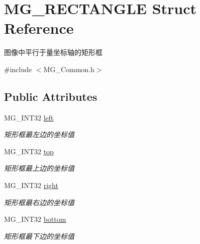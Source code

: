 \hypertarget{struct_m_g___r_e_c_t_a_n_g_l_e}{}\section{M\+G\+\_\+\+R\+E\+C\+T\+A\+N\+G\+LE Struct Reference}
\label{struct_m_g___r_e_c_t_a_n_g_l_e}


图像中平行于量坐标轴的矩形框  




{\ttfamily \#include $<$M\+G\+\_\+\+Common.\+h$>$}

\subsection*{Public Attributes}
\begin{DoxyCompactItemize}
\item 
\mbox{\label{struct_m_g___r_e_c_t_a_n_g_l_e_a0f4b5d317c394e8a54d395a0780d83df}} 
M\+G\+\_\+\+I\+N\+T32 \hyperlink{struct_m_g___r_e_c_t_a_n_g_l_e_a0f4b5d317c394e8a54d395a0780d83df}{left}
\begin{DoxyCompactList}\small\item\em 矩形框最左边的坐标值 \end{DoxyCompactList}\item 
\mbox{\label{struct_m_g___r_e_c_t_a_n_g_l_e_a5732b31f8506debe2fb6c0cd7ea0b80f}} 
M\+G\+\_\+\+I\+N\+T32 \hyperlink{struct_m_g___r_e_c_t_a_n_g_l_e_a5732b31f8506debe2fb6c0cd7ea0b80f}{top}
\begin{DoxyCompactList}\small\item\em 矩形框最上边的坐标值 \end{DoxyCompactList}\item 
\mbox{\label{struct_m_g___r_e_c_t_a_n_g_l_e_af98bc1a68ec2b86b8b0dee733175801d}} 
M\+G\+\_\+\+I\+N\+T32 \hyperlink{struct_m_g___r_e_c_t_a_n_g_l_e_af98bc1a68ec2b86b8b0dee733175801d}{right}
\begin{DoxyCompactList}\small\item\em 矩形框最右边的坐标值 \end{DoxyCompactList}\item 
\mbox{\label{struct_m_g___r_e_c_t_a_n_g_l_e_a6ca3c4b559186ca87d377f7247258605}} 
M\+G\+\_\+\+I\+N\+T32 \hyperlink{struct_m_g___r_e_c_t_a_n_g_l_e_a6ca3c4b559186ca87d377f7247258605}{bottom}
\begin{DoxyCompactList}\small\item\em 矩形框最下边的坐标值 \end{DoxyCompactList}\end{DoxyCompactItemize}


